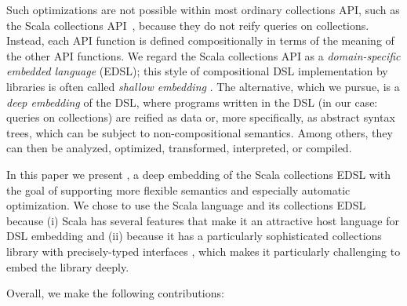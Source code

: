 Such optimizations are not possible within most ordinary collections API, such as the Scala collections API~\cite{odersky2009fighting}, because they
do not reify queries on collections. Instead, each API function is defined compositionally in terms
of the meaning of the other API functions.
We regard the Scala collections API as a \emph{domain-specific embedded language} (EDSL); this style of compositional DSL implementation by libraries is often
called \emph{shallow embedding}%
. The alternative, which we pursue, is a \emph{deep embedding} of the DSL, where programs written in the DSL (in our case: 
queries on collections) are reified as data or, more specifically, as abstract syntax trees, which can be subject to non-compositional semantics. Among others, they can then be analyzed, optimized, transformed, interpreted, or compiled.

In this paper we present \LoS, a deep embedding of the Scala collections EDSL with the goal of supporting more flexible semantics and especially automatic optimization.
We chose to use the Scala language and its collections EDSL because (i) Scala has several features that make it an attractive host language for DSL embedding \citep{Odersky11book} and (ii) because it has a particularly sophisticated collections library with precisely-typed interfaces \citep{odersky2009fighting}, which makes it particularly challenging to embed the library deeply.




Overall, we make the following contributions:


